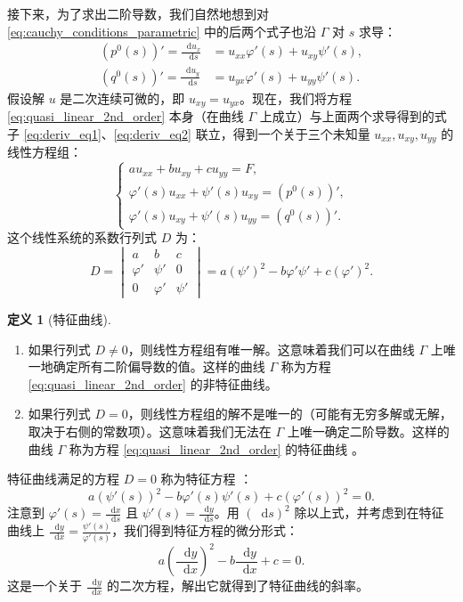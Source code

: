 \documentclass[12pt,a4paper]{article}
\newcommand{\diff}{\mathop{}\!\mathrm{d}}
\numberwithin{subsection}{section}
\numberwithin{subsubsection}{subsection}
\theoremstyle{plain}
\theoremstyle{definition}
\newtheorem{definition}[theorem]{定义}
\theoremstyle{remark}
\begin{document}
	接下来，为了求出二阶导数，我们自然地想到对 \eqref{eq:cauchy_conditions_parametric} 中的后两个式子也沿 \(\Gamma\) 对 \(s\) 求导：
	\begin{align}
		(p^0(s))' = \frac{\diff u_x}{\diff s} &= u_{xx}\varphi'(s) + u_{xy}\psi'(s), \label{eq:deriv_eq1} \\
		(q^0(s))' = \frac{\diff u_y}{\diff s} &= u_{yx}\varphi'(s) + u_{yy}\psi'(s). \label{eq:deriv_eq2}
	\end{align}
	假设解 \(u\) 是二次连续可微的，即 \(u_{xy} = u_{yx}\)。现在，我们将方程 \eqref{eq:quasi_linear_2nd_order} 本身（在曲线 \(\Gamma\) 上成立）与上面两个求导得到的式子 \eqref{eq:deriv_eq1}、\eqref{eq:deriv_eq2} 联立，得到一个关于三个未知量 \(u_{xx}, u_{xy}, u_{yy}\) 的线性方程组：
	\begin{equation}
		\begin{cases}
			a u_{xx} + b u_{xy} + c u_{yy} = F, \\
			\varphi'(s) u_{xx} + \psi'(s) u_{xy} = (p^0(s))', \\
			\varphi'(s) u_{xy} + \psi'(s) u_{yy} = (q^0(s))'.
		\end{cases}
	\end{equation}
	这个线性系统的系数行列式 \(D\) 为：
	\begin{equation}
		D = 
		\begin{vmatrix}
			a & b & c \\
			\varphi' & \psi' & 0 \\
			0 & \varphi' & \psi'
		\end{vmatrix}
		= a(\psi')^2 - b\varphi'\psi' + c(\varphi')^2.
	\end{equation}
	
	\begin{definition}[特征曲线]
		\begin{enumerate}[label=(\roman*)]
			\item 如果行列式 \(D \neq 0\)，则线性方程组有唯一解。这意味着我们可以在曲线 \(\Gamma\) 上唯一地确定所有二阶偏导数的值。这样的曲线 \(\Gamma\) 称为方程 \eqref{eq:quasi_linear_2nd_order} 的非特征曲线。
			\item 如果行列式 \(D = 0\)，则线性方程组的解不是唯一的（可能有无穷多解或无解，取决于右侧的常数项）。这意味着我们无法在 \(\Gamma\) 上唯一确定二阶导数。这样的曲线 \(\Gamma\) 称为方程 \eqref{eq:quasi_linear_2nd_order} 的特征曲线 。
		\end{enumerate}
	\end{definition}
	
	特征曲线满足的方程 \(D=0\) 称为特征方程 ：
	\begin{equation}\label{eq:characteristic_eq_parametric}
		a(\psi'(s))^2 - b\varphi'(s)\psi'(s) + c(\varphi'(s))^2 = 0.
	\end{equation}
	注意到 \(\varphi'(s) = \frac{\diff x}{\diff s}\) 且 \(\psi'(s) = \frac{\diff y}{\diff s}\)。用 \((\diff s)^2\) 除以上式，并考虑到在特征曲线上 \(\frac{\diff y}{\diff x} = \frac{\psi'(s)}{\varphi'(s)}\)，我们得到特征方程的微分形式：
	\begin{equation}\label{eq:characteristic_ode}
		a \left(\frac{\diff y}{\diff x}\right)^2 - b \frac{\diff y}{\diff x} + c = 0.
	\end{equation}
	这是一个关于 \(\frac{\diff y}{\diff x}\) 的二次方程，解出它就得到了特征曲线的斜率。
	
\end{document}
